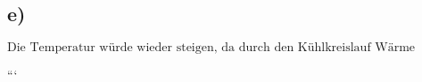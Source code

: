 

\subsection*{e)}

\[
\text{Die Temperatur würde wieder steigen, da durch den Kühlkreislauf Wärme dazukommt.}
\]

```